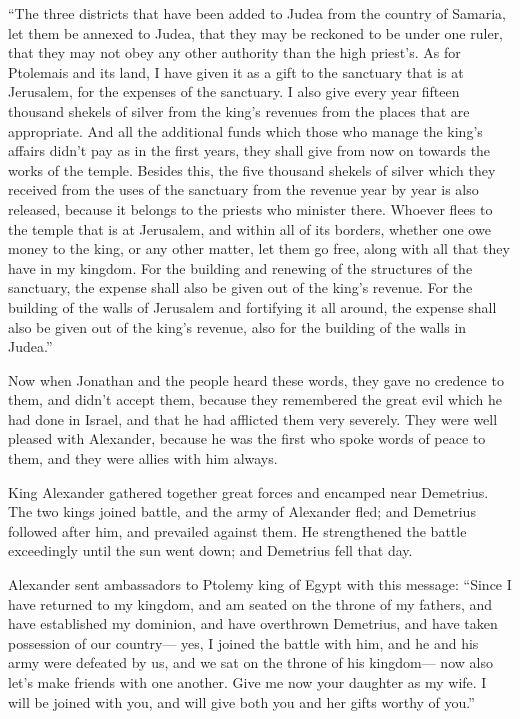  ``The three districts that have been added to Judea from
the country of Samaria, let them be annexed to Judea, that they may be
reckoned to be under one ruler, that they may not obey any other
authority than the high priest's.  As for Ptolemais and its
land, I have given it as a gift to the sanctuary that is at Jerusalem,
for the expenses of the sanctuary.  I also give every year
fifteen thousand shekels of silver from the king's revenues from the
places that are appropriate.  And all the additional funds
which those who manage the king's affairs didn't pay as in the first
years, they shall give from now on towards the works of the temple.
 Besides this, the five thousand shekels of silver which
they received from the uses of the sanctuary from the revenue year by
year is also released, because it belongs to the priests who minister
there.  Whoever flees to the temple that is at Jerusalem,
and within all of its borders, whether one owe money to the king, or any
other matter, let them go free, along with all that they have in my
kingdom.  For the building and renewing of the structures
of the sanctuary, the expense shall also be given out of the king's
revenue.  For the building of the walls of Jerusalem and
fortifying it all around, the expense shall also be given out of the
king's revenue, also for the building of the walls in Judea.''

 Now when Jonathan and the people heard these words, they
gave no credence to them, and didn't accept them, because they
remembered the great evil which he had done in Israel, and that he had
afflicted them very severely.  They were well pleased with
Alexander, because he was the first who spoke words of peace to them,
and they were allies with him always.

 King Alexander gathered together great forces and encamped
near Demetrius.  The two kings joined battle, and the army
of Alexander fled; and Demetrius followed after him, and prevailed
against them.  He strengthened the battle exceedingly until
the sun went down; and Demetrius fell that day.

 Alexander sent ambassadors to Ptolemy king of Egypt with
this message:  ``Since I have returned to my kingdom, and
am seated on the throne of my fathers, and have established my dominion,
and have overthrown Demetrius, and have taken possession of our
country---  yes, I joined the battle with him, and he and
his army were defeated by us, and we sat on the throne of his kingdom---
 now also let's make friends with one another. Give me now
your daughter as my wife. I will be joined with you, and will give both
you and her gifts worthy of you.''

